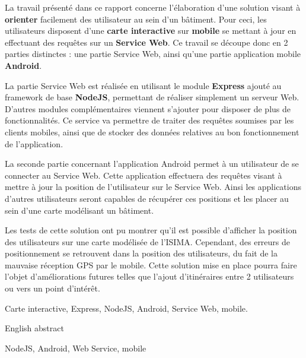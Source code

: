 

La travail présenté dans ce rapport concerne l'élaboration d'une solution visant à \textbf{orienter} facilement des utilisateur au sein d'un bâtiment. Pour ceci, les utilisateurs disposent d'une \textbf{carte interactive} sur \textbf{mobile} se mettant à jour en effectuant des requêtes sur un \textbf{Service Web}. Ce travail se découpe donc en 2 parties distinctes : une partie Service Web, ainsi qu'une partie application mobile \textbf{Android}.

La partie Service Web est réalisée en utilisant le module \textbf{Express} ajouté au framework de base \textbf{NodeJS}, permettant de réaliser simplement un serveur Web. D'autres modules complémentaires viennent s'ajouter pour disposer de plus de fonctionnalités. Ce service va permettre de traiter des requêtes soumises par les clients mobiles, ainsi que de stocker des données relatives au bon fonctionnement de l'application.

La seconde partie concernant l'application Android permet à un utilisateur de se connecter au Service Web. Cette application effectuera des requêtes visant à mettre à jour la position de l'utilisateur sur le Service Web. Ainsi les applications d'autres utilisateurs seront capables de récupérer ces positions et les placer au sein d'une carte modélisant un bâtiment.

Les tests de cette solution ont pu montrer qu'il est possible d'afficher la position des utilisateurs sur une carte modélisée de l'ISIMA. Cependant, des erreurs de positionnement se retrouvent dans la position des utilisateurs, du fait de la mauvaise réception GPS par le mobile. Cette solution mise en place pourra faire l'objet d'améliorations futures telles que l'ajout d'itinéraires entre 2 utilisateurs ou vers un point d'intérêt.

Carte interactive, Express, NodeJS, Android, Service Web, mobile.


English abstract

NodeJS, Android, Web Service, mobile


